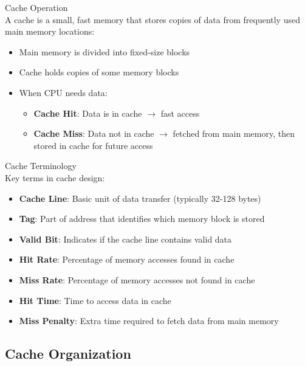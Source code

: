 \begin{concept}{Cache Operation}\\
A cache is a small, fast memory that stores copies of data from frequently used main memory locations:
\begin{itemize}
    \item Main memory is divided into fixed-size blocks
    \item Cache holds copies of some memory blocks
    \item When CPU needs data:
    \begin{itemize}
        \item \textbf{Cache Hit}: Data is in cache $\rightarrow$ fast access
        \item \textbf{Cache Miss}: Data not in cache $\rightarrow$ fetched from main memory, then stored in cache for future access
    \end{itemize}
\end{itemize}
\end{concept}

\begin{definition}{Cache Terminology}\\
Key terms in cache design:
\begin{itemize}
    \item \textbf{Cache Line}: Basic unit of data transfer (typically 32-128 bytes)
    \item \textbf{Tag}: Part of address that identifies which memory block is stored
    \item \textbf{Valid Bit}: Indicates if the cache line contains valid data
    \item \textbf{Hit Rate}: Percentage of memory accesses found in cache
    \item \textbf{Miss Rate}: Percentage of memory accesses not found in cache
    \item \textbf{Hit Time}: Time to access data in cache
    \item \textbf{Miss Penalty}: Extra time required to fetch data from main memory
\end{itemize}
\end{definition}

\raggedcolumns
\columnbreak

\subsection{Cache Organization}


